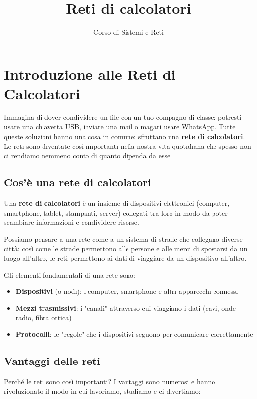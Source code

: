 \documentclass[12pt,a4paper]{article}
\title{Reti di calcolatori}
\author{Corso di Sistemi e Reti}
\begin{document}
\maketitle

\tableofcontents
\newpage
\section{Introduzione alle Reti di Calcolatori}

Immagina di dover condividere un file con un tuo compagno di classe: potresti usare una chiavetta USB, inviare una mail o magari usare WhatsApp. Tutte queste soluzioni hanno una cosa in comune: sfruttano una \textbf{rete di calcolatori}. Le reti sono diventate così importanti nella nostra vita quotidiana che spesso non ci rendiamo nemmeno conto di quanto dipenda da esse.

\subsection{Cos'è una rete di calcolatori}

Una \textbf{rete di calcolatori} è un insieme di dispositivi elettronici (computer, smartphone, tablet, stampanti, server) collegati tra loro in modo da poter scambiare informazioni e condividere risorse.

Possiamo pensare a una rete come a un sistema di strade che collegano diverse città: così come le strade permettono alle persone e alle merci di spostarsi da un luogo all'altro, le reti permettono ai dati di viaggiare da un dispositivo all'altro.

Gli elementi fondamentali di una rete sono:
\begin{itemize}
    \item \textbf{Dispositivi} (o nodi): i computer, smartphone e altri apparecchi connessi
    \item \textbf{Mezzi trasmissivi}: i "canali" attraverso cui viaggiano i dati (cavi, onde radio, fibra ottica)
    \item \textbf{Protocolli}: le "regole" che i dispositivi seguono per comunicare correttamente
\end{itemize}

\subsection{Vantaggi delle reti}

Perché le reti sono così importanti? I vantaggi sono numerosi e hanno rivoluzionato il modo in cui lavoriamo, studiamo e ci divertiamo:
\end{document}
